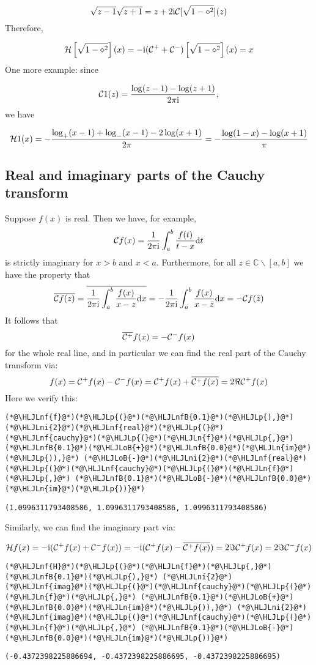 \documentclass[12pt,landscape]{article}
\newcommand{\HLJLn}[1]{#1}
\newcommand{\HLJLnf}[1]{\textcolor[RGB]{66,102,213}{#1}}
\newcommand{\HLJLnfB}[1]{\textcolor[RGB]{59,151,46}{#1}}
\newcommand{\HLJLni}[1]{\textcolor[RGB]{59,151,46}{#1}}
\newcommand{\HLJLoB}[1]{\textcolor[RGB]{102,102,102}{\textbf{#1}}}
\newcommand{\HLJLp}[1]{#1}
\def\D{ {\rm d} }
\def\I{ {\rm i} }
\def\C{ {\mathbb C} }
\def\CC{ {\cal C} }
\def\HH{ {\cal H} }
\def\dx{\D x}
\def\dt{\D t}
\begin{document}
{\[
\sqrt{z-1}\sqrt{z+1} = z  + 2 \I {\cal C}[\sqrt{1-\diamond^2}](z)
\]
Therefore,

\[
{\cal H}\left[{\sqrt{1-\diamond^2}}\right](x) = -\I (\CC^+  + \CC^-) \left[{\sqrt{1-\diamond^2}}\right](x) = x
\]
One more example: since

\[
\CC 1(z) = {\log(z-1) - \log(z+1) \over 2 \pi \I},
\]
we have

\[
\HH 1(x) = -{\log_+(x-1) + \log_-(x-1) - 2\log(x+1) \over 2\pi} = -{\log(1-x) - \log(x+1) \over \pi}
\]
\subsection{Real and imaginary parts of the Cauchy transform}
Suppose $f(x)$ is real. Then we have, for example,
\[
\CC f(x) = {1 \over 2 \pi \I} \int_a^b {f(t) \over t- x} \dt
\]
is strictly imaginary for $x > b$ and $x < a$.  Furthermore, for all $z \in \C \backslash [a,b]$ we have the property that
\[
\overline{\CC f( z)} = \overline{{1 \over 2 \pi \I} \int_a^b {f(x) \over x - z} \dx} =
-{1 \over 2 \pi \I} \int_a^b {f(x) \over x - \bar z} \dx = - \CC f(\bar z)
\]
It follows that
\[
\overline{\CC^+} f(x) = - \CC^- f(x)
\]
for the whole real line, and in particular we can find the real part of the Cauchy transform via:
\[
f(x) = \CC^+ f(x) - \CC^- f(x) = \CC^+ f(x) + \overline{\CC^+ f(x)} = 2 \Re \CC^+ f(x)
\]
Here we verify this:


\begin{lstlisting}
(*@\HLJLnf{f}@*)(*@\HLJLp{(}@*)(*@\HLJLnfB{0.1}@*)(*@\HLJLp{),}@*) (*@\HLJLni{2}@*)(*@\HLJLnf{real}@*)(*@\HLJLp{(}@*)(*@\HLJLnf{cauchy}@*)(*@\HLJLp{(}@*)(*@\HLJLn{f}@*)(*@\HLJLp{,}@*) (*@\HLJLnfB{0.1}@*)(*@\HLJLoB{+}@*)(*@\HLJLnfB{0.0}@*)(*@\HLJLn{im}@*)(*@\HLJLp{)),}@*) (*@\HLJLoB{-}@*)(*@\HLJLni{2}@*)(*@\HLJLnf{real}@*)(*@\HLJLp{(}@*)(*@\HLJLnf{cauchy}@*)(*@\HLJLp{(}@*)(*@\HLJLn{f}@*)(*@\HLJLp{,}@*) (*@\HLJLnfB{0.1}@*)(*@\HLJLoB{-}@*)(*@\HLJLnfB{0.0}@*)(*@\HLJLn{im}@*)(*@\HLJLp{))}@*)
\end{lstlisting}

\begin{lstlisting}
(1.0996311793408586, 1.0996311793408586, 1.0996311793408586)
\end{lstlisting}

\newpage
Similarly, we can find the imaginary part via:

\[
{\cal H} f(x) = -\I(\CC^+ f(x) + \CC^- f(x)) = -\I(\CC^+ f(x) - \overline{\CC^+ f(x)}) =
2 \Im \CC^+ f(x) = 2 \Im \CC^- f(x)
\]

\begin{lstlisting}
(*@\HLJLnf{H}@*)(*@\HLJLp{(}@*)(*@\HLJLn{f}@*)(*@\HLJLp{,}@*) (*@\HLJLnfB{0.1}@*)(*@\HLJLp{),}@*) (*@\HLJLni{2}@*)(*@\HLJLnf{imag}@*)(*@\HLJLp{(}@*)(*@\HLJLnf{cauchy}@*)(*@\HLJLp{(}@*)(*@\HLJLn{f}@*)(*@\HLJLp{,}@*) (*@\HLJLnfB{0.1}@*)(*@\HLJLoB{+}@*)(*@\HLJLnfB{0.0}@*)(*@\HLJLn{im}@*)(*@\HLJLp{)),}@*) (*@\HLJLni{2}@*)(*@\HLJLnf{imag}@*)(*@\HLJLp{(}@*)(*@\HLJLnf{cauchy}@*)(*@\HLJLp{(}@*)(*@\HLJLn{f}@*)(*@\HLJLp{,}@*) (*@\HLJLnfB{0.1}@*)(*@\HLJLoB{-}@*)(*@\HLJLnfB{0.0}@*)(*@\HLJLn{im}@*)(*@\HLJLp{))}@*)
\end{lstlisting}

\begin{lstlisting}
(-0.4372398225886694, -0.4372398225886695, -0.4372398225886695)
\end{lstlisting}


}
\end{document}
